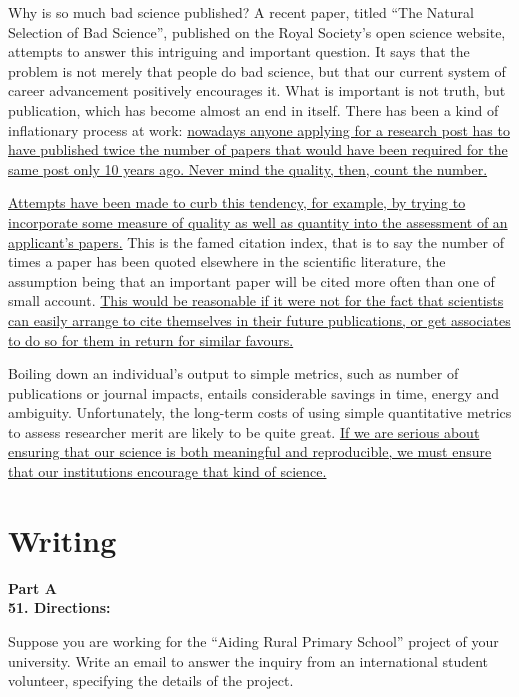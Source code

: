 Why is so much bad science
published? A recent paper, titled ``The Natural Selection of Bad
Science'', published on the Royal Society's open science website,
attempts to answer this intriguing and important question. It says that
the problem is not merely that people do bad science, but that our
current system of career advancement positively encourages it. What is
important is not truth, but publication, which has become almost an end
in itself. There has been a kind of inflationary process at work: \transnum \uline{nowadays anyone applying for a research post has to have published twice
the number of papers that would have been required for the same post
only 10 years ago. Never mind the quality, then, count the number.}



\transnum \uline{Attempts have been made to curb this tendency, for example,
by trying to incorporate some measure of quality as well as quantity
into the assessment of an applicant's papers.} This is the famed citation
index, that is to say the number of times a paper has been quoted
elsewhere in the scientific literature, the assumption being that an
important paper will be cited more often than one of small account. \transnum \uline{This would be reasonable if it were not for the fact that scientists can
easily arrange to cite themselves in their future publications, or get
associates to do so for them in return for similar favours.}



Boiling down an individual's output to simple metrics, such as
number of publications or journal impacts, entails considerable savings
in time, energy and ambiguity. Unfortunately, the long-term costs of
using simple quantitative metrics to assess researcher merit are likely
to be quite great. \transnum \uline{If we are serious about ensuring that our
science is both meaningful and reproducible, we must ensure that our
institutions encourage that kind of science.}



\newpage

\section{Writing}

\noindent
\textbf{Part A}\\
\textbf{51. Directions:} 
 
 Suppose you are working for the ``Aiding
Rural Primary School'' project of your university. Write an email to
answer the inquiry from an international student volunteer, specifying
the details of the project. 

